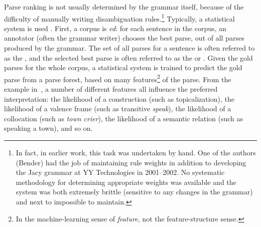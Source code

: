 \documentclass[output=paper
                ,modfonts
                ,nonflat
	        ,collection
	        ,collectionchapter
	        ,collectiontoclongg
 	        ,biblatex
                ,babelshorthands
                ,newtxmath
                ,draftmode
                ,colorlinks, citecolor=brown
]{./langsci/langscibook}
\begin{document}
Parse ranking is not usually determined by the grammar itself, because
of the difficulty of manually writing disambiguation
rules.\footnote{In fact, in earlier work, this task was undertaken by
  hand. One of the authors (Bender) had the job of maintaining rule
  weights in addition to developing the Jacy grammar \citep*{SBB2016a}
  at YY Technologies in 2001--2002. No systematic methodology for
  determining appropriate weights was available and the system was
  both extremely brittle (sensitive to any changes in the grammar) and
  next to impossible to maintain.}
Typically, a statistical system is used \citep{Tou:Man:Shi:Fli:Oep:02,Tou:Man:Fli:Oep:05}.
First, a corpus is \textit{ed}:
for each sentence in the corpus,
an annotator (often the grammar writer) chooses the best parse,
out of all parses produced by the grammar.
The set of all parses for a sentence is often referred to as the \textit{},
and the selected best parse is often referred to as the \textit{} or \textit{}.
Given the gold parses for the whole corpus, a statistical system is trained
to predict the gold parse from a parse forest,
based on many features\footnote{%
	In the machine-learning sense of \textit{feature},
	not the feature-structure sense.
}
of the parse.
From the example in~,
a number of different features all influence the preferred interpretation:
the likelihood of a construction (such as topicalization),
the likelihood of a valence frame (such as transitive \textit{speak}),
the likelihood of a collocation (such as \textit{town crier}),
the likelihood of a semantic relation (such as speaking a town),
and so on.
\end{document}

